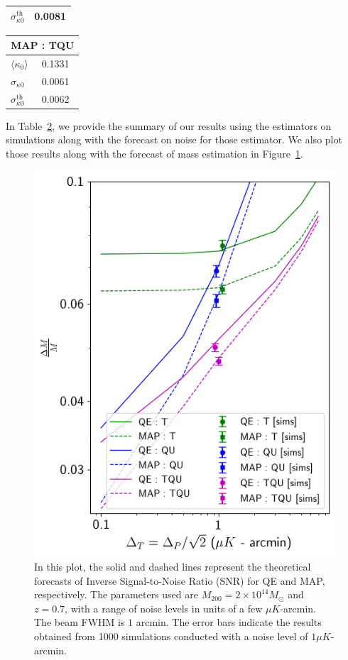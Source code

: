 \documentclass[prd, superscriptaddress, tightenlines, longbibliography, nofootinbib, eqsecnum, amsfonts, amsmath, floatfix, twocolumn, notitlepage]{revtex4-2}
\begin{document}
\begin{table}
\begin{tabularx}{0.15\textwidth}{|X|X|}
    $\sigma_{\kappa 0}^{\text{th}}$ & 0.0081  \\\hline
    \end{tabularx}
    \begin{tabularx}{0.15\textwidth}{|X|X|}
    \hline
    \multicolumn{2}{|c|}{MAP : TQU} \\ \hline
    $\langle\kappa_0 \rangle$      & 0.1331   \\ \hline
    $\sigma_{\kappa 0}$ & 0.0061  \\\hline
    $\sigma_{\kappa 0}^{\text{th}}$ & 0.0062  \\\hline
    \end{tabularx}
    \label{tab:results}
\end{table}

In Table~\ref{tab:results}, we provide the summary of our results using the estimators on simulations along with the forecast on noise for those estimator. We also plot those results along with the forecast of mass estimation in Figure~\ref{fig:forecast}.   
\begin{figure}[H]
    \centering
    \includegraphics[width=1.\hsize]{Figures/forcast_snr.png}
    \caption{In this plot, the solid and dashed lines represent the theoretical forecasts of Inverse Signal-to-Noise Ratio (SNR) for QE and MAP, respectively. The parameters used are $M_{200} = 2\times10^{14}M_{\odot}$ and $z=0.7$, with a range of noise levels in units of a few $\mu K$-arcmin. The beam FWHM is $1$ arcmin. The error bars indicate the results obtained from 1000 simulations conducted with a noise level of $1 \mu K$-arcmin.}
    \label{fig:forecast}
\end{figure}
\end{document}
